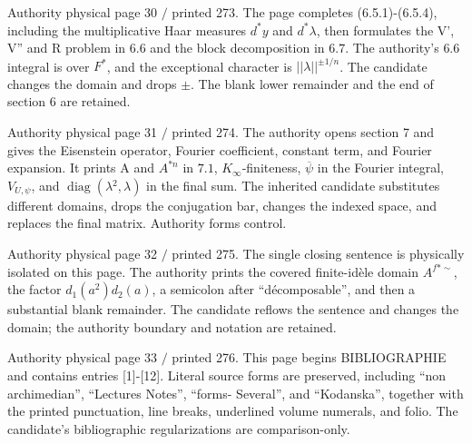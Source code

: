 \documentclass[10pt,a4paper]{article}
\begin{document}
\clearpage
{}
\label{d035-physical-030}
\par Authority physical page 30 $/$ printed 273. The page completes (6.5.1)-(6.5.4), including the multiplicative Haar measures $d^*y$ and $d^*\lambda{}$, then formulates the V', V'' and R problem in $6.6$ and the block decomposition in $6.7$. The authority's $6.6$ integral is over $F^*$, and the exceptional character is $||\lambda{}||^{\pm{}1/n}$. The candidate changes the domain and drops $\pm{}$. The blank lower remainder and the end of section 6 are retained.\par

\clearpage
{}
\label{d035-physical-031}
\par Authority physical page 31 $/$ printed 274. The authority opens section 7 and gives the Eisenstein operator, Fourier coefficient, constant term, and Fourier expansion. It prints A and $A^{*n}$ in $7.1$, $K_\infty{}$-finiteness, $\overline{\psi{}}$ in the Fourier integral, $V_{U,\psi{}}$, and $\operatorname{diag}(\lambda{}^{2},\lambda{})$ in the final sum. The inherited candidate substitutes different domains, drops the conjugation bar, changes the indexed space, and replaces the final matrix. Authority forms control.\par

\clearpage
{}
\label{d035-physical-032}
\par Authority physical page 32 $/$ printed 275. The single closing sentence is physically isolated on this page. The authority prints the covered finite-idèle domain $A^{f*\sim}$, the factor $d_1(a^{2})d_2(a)$, a semicolon after ``décomposable'', and then a substantial blank remainder. The candidate reflows the sentence and changes the domain; the authority boundary and notation are retained.\par

\clearpage
{}
\label{d035-physical-033}
\par Authority physical page 33 $/$ printed 276. This page begins BIBLIOGRAPHIE and contains entries [1]-[12]. Literal source forms are preserved, including ``non archimedian'', ``Lectures Notes'', ``forms- Several'', and ``Kodanska'', together with the printed punctuation, line breaks, underlined volume numerals, and folio. The candidate's bibliographic regularizations are comparison-only.\par
\end{document}
